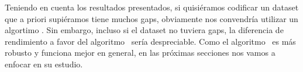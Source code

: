 Teniendo en cuenta los resultados presentados, si quisiéramos codificar un dataset que a priori supiéramos tiene muchos gaps, obviamente nos convendría utilizar un algortimo \cmaskalgo. Sin embargo, incluso si el dataset no tuviera gaps, la diferencia de rendimiento a favor del algoritmo \cNOmaskalgo \ sería despreciable. Como el algoritmo \cmaskalgo \ es más robusto y funciona mejor en general, en las próximas secciones nos vamos a enfocar en su estudio.



